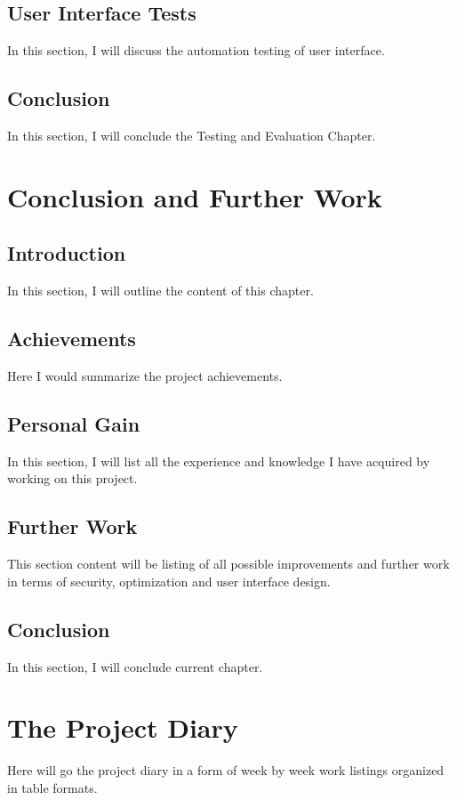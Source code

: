 \documentclass[12pt,twoside,a4paper]{report}
\begin{document}
\section{User Interface Tests}
In this section, I will discuss the automation testing of user interface.

\section{Conclusion}
In this section, I will conclude the Testing and Evaluation Chapter.

\chapter{Conclusion and Further Work}
\section{Introduction}
In this section, I will outline the content of this chapter.

\section{Achievements}
Here I would summarize the project achievements.

\section{Personal Gain}
In this section, I will list all the experience and knowledge I have acquired by working on this project.

\section{Further Work}
This section content will be listing of all possible improvements and further work in terms of security, optimization and user interface design.

\section{Conclusion}
In this section, I will conclude current chapter.

\appendix
\chapter{The Project Diary}
Here will go the project diary in a form of week by week work listings organized in table formats.
\end{document}
